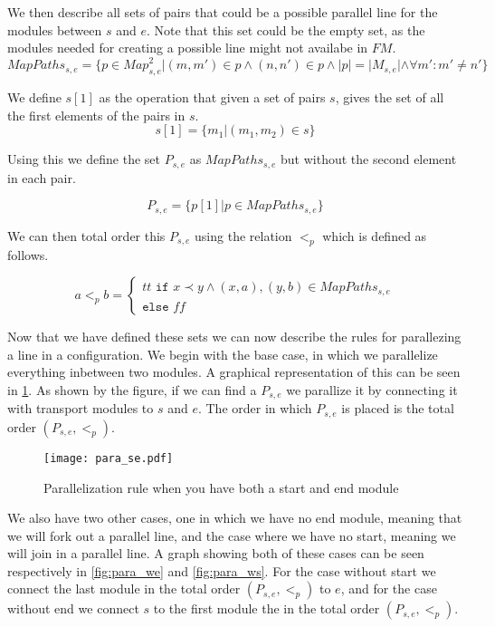 We then describe all sets of pairs that could be a possible parallel line for the modules between $s$ and $e$. Note that this set could be the empty set, as the modules needed for creating a possible line might not availabe in $FM$.
\[MapPaths_{s,e} = \{p \in {Map}_{s,e}^2 | (m,m') \in p \land (n,n') \in p \land |p| = |M_{s,e}| \land  \forall m': m' \neq n' \}\]

We define $s[1]$ as the operation that given a set of pairs $s$, gives the set of all the first elements of the pairs in $s$.
\[s[1] = \{m_1 | (m_1, m_2) \in s\}\]

Using this we define the set $P_{s,e}$ as $MapPaths_{s,e}$ but without the second element in each pair.

\[ P_{s,e} = \{p[1] | p \in MapPaths_{s,e}\}\]

We can then total order this $P_{s,e}$ using the relation $<_p$ which is defined as follows.

\[a <_{p} b = 
\left\{\begin{matrix}
tt \texttt{ if } x \prec y \land (x, a), (y, b) \in MapPaths_{s,e}\\
\texttt{else } ff
\end{matrix}\right.\]

Now that we have defined these sets we can now describe the rules for parallezing a line in a configuration. We begin with the base case, in which we parallelize everything inbetween two modules. A graphical representation of this can be seen in \cref{fig:para_se}. As shown by the figure, if we can find a $P_{s,e}$ we parallize it by connecting it with transport modules to $s$ and $e$. The order in which $P_{s,e}$ is placed is the total order $(P_{s,e},<_p)$. 

\begin{figure}[h]
\centering
\texttt{[image: para\_se.pdf]}
\caption{Parallelization rule when you have both a start and end module}
\label{fig:para_se}
\end{figure}


We also have two other cases, one in which we have no end module, meaning that we will fork out a parallel line, and the case where we have no start, meaning we will join in a parallel line. A graph showing both of these cases can be seen respectively in \cref{fig:para_we} and \cref{fig:para_ws}. For the case without start we connect the last module in the total order $(P_{s,e}, <_p)$ to $e$, and for the case without end we connect $s$ to the first module the in the total order $(P_{s,e}, <_p)$.


